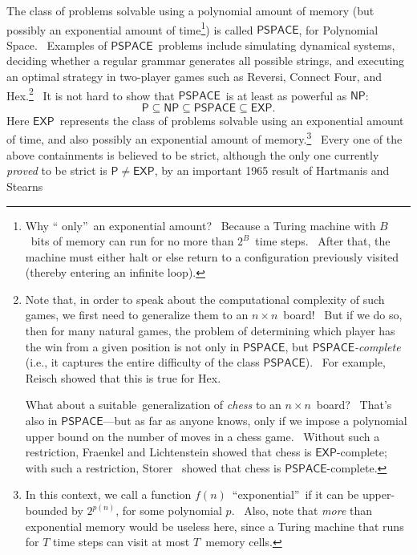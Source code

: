 \documentclass[11pt,onecolumn]{article}%
\begin{document}
The class of problems solvable using a polynomial amount of memory (but
possibly an exponential amount of time\footnote{Why \textquotedblleft
only\textquotedblright\ an exponential amount? \ Because a Turing machine with
$B$\ bits of memory can run for no more than $2^{B}$\ time steps. \ After
that, the machine must either halt or else return to a configuration
previously visited (thereby entering an infinite loop).}) is called
$\mathsf{PSPACE}$, for Polynomial Space. \ Examples of $\mathsf{PSPACE}%
$\ problems include simulating dynamical systems, deciding whether a regular
grammar generates all possible strings, and executing an optimal strategy in
two-player games such as Reversi, Connect Four, and
Hex.\footnote{\label{chessnote}Note that, in order to speak about the
computational complexity of such games, we first need to generalize them to an
$n\times n$\ board! \ But if we do so, then for many natural games, the
problem of determining which player has the win from a given position is not
only in $\mathsf{PSPACE}$, but $\mathsf{PSPACE}$\textit{-complete} (i.e., it
captures the entire difficulty of the class $\mathsf{PSPACE}$). \ For example,
Reisch \cite{reisch} showed that this is true for Hex.
\par
What about a suitable\ generalization of \textit{chess} to an $n\times
n$\ board? \ That's also in $\mathsf{PSPACE}$---but as far as anyone knows,
only if we impose a polynomial upper bound on the number of moves in a chess
game. \ Without such a restriction, Fraenkel and Lichtenstein \cite{fraenkel}
showed that chess is $\mathsf{EXP}$-complete; with such a restriction, Storer
\cite{storer}\ showed that chess is $\mathsf{PSPACE}$-complete.} \ It is not
hard to show that $\mathsf{PSPACE}$\ is at least as powerful as $\mathsf{NP}$:%
\[
\mathsf{P}\subseteq\mathsf{NP}\subseteq\mathsf{PSPACE}\subseteq\mathsf{EXP}.
\]
Here $\mathsf{EXP}$\ represents the class of problems solvable using an
exponential amount of time, and also possibly an exponential amount of
memory.\footnote{In this context, we call a function $f\left(  n\right)
$\ \textquotedblleft exponential\textquotedblright\ if it can be upper-bounded
by $2^{p\left(  n\right)  }$, for some polynomial $p$. \ Also, note that
\textit{more} than exponential memory would be useless here, since a Turing
machine that runs for $T$ time steps can visit at most $T$\ memory cells.}
\ Every one of the above containments is believed to be strict, although the
only one currently \textit{proved} to be strict is $\mathsf{P}\neq
\mathsf{EXP}$, by an important 1965 result of Hartmanis and Stearns
\end{document}
